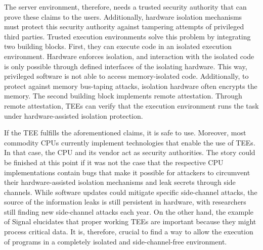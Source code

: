 The server environment, therefore, needs a trusted security authority that can prove these claims to the users.
Additionally, hardware isolation mechanisms must protect this security authority against tampering attempts of
privileged third parties. Trusted execution environments solve this
problem by integrating two building blocks. First, they can execute code in an isolated execution environment.
Hardware enforces isolation, and interaction with the isolated code is only possible through defined interfaces of
the isolating hardware. This way, privileged software is not able to access memory-isolated code. Additionally, to
protect against memory bus-taping attacks, isolation hardware often encrypts the memory. The second building block
implements remote attestation. Through remote attestation, TEEs can verify that the execution environment runs the task
under hardware-assisted isolation protection.

If the TEE fulfills the aforementioned claims, it is safe to use. Moreover, most commodity CPUs currently
implement technologies that enable the use of TEEs. In that case, the CPU and its vendor act as
security authorities.\cite{tdx_whitepaper,kaplan_amd_2020,pinto_demystifying_2019,costan2016intel}
The story could be finished at this point if it was not the case that the respective CPU implementations contain bugs
that make it possible for attackers to circumvent their hardware-assisted isolation mechanisms and leak secrets through
side channels.\cite{kocher_spectre_2020,lipp_meltdown_2020,nilsson_survey_2020} While software updates could mitigate
specific side-channel attacks, the source of the information leaks is still persistent in hardware, with researchers
still finding new side-channel attacks each year.\cite{wikner2022retbleed,moghimi_downfall_2023,ragab_ghostrace_2024}
On the other hand, the example of Signal elucidates that proper working TEEs are important because they might process
critical data. It is, therefore, crucial to find a way to allow the execution of programs in a completely isolated and
side-channel-free environment.
